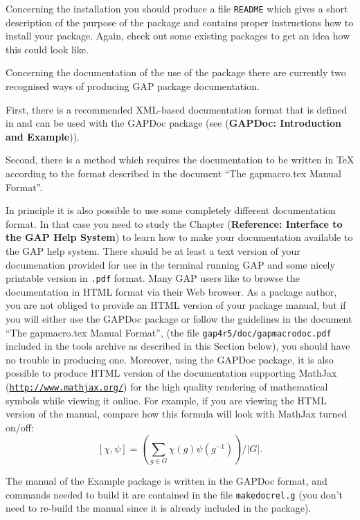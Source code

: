 \documentclass[a4paper,11pt]{report}
\begin{document}
{{ Concerning the installation you should produce a file \texttt{README} which gives a short description of the purpose of the package and contains
proper instructions how to install your package. Again, check out some
existing packages to get an idea how this could look like. 

 Concerning the documentation of the use of the package there are currently two
recognised ways of producing \textsf{GAP} package documentation. 

 First, there is a recommended XML-based documentation format that is defined
in and can be used with the \textsf{GAPDoc} package (see{\nobreakspace} (\textbf{GAPDoc: Introduction and Example})). 

 Second, there is a method which requires the documentation to be written in {\TeX} according to the format described in the document ``The gapmacro.tex Manual Format''. 

 In principle it is also possible to use some completely different
documentation format. In that case you need to study the
Chapter{\nobreakspace} (\textbf{Reference: Interface to the GAP Help System}) to learn how to make your documentation available to the \textsf{GAP} help system. There should be at least a text version of your documenation
provided for use in the terminal running \textsf{GAP} and some nicely printable version in \texttt{.pdf} format. Many \textsf{GAP} users like to browse the documentation in HTML format via their Web browser.
As a package author, you are not obliged to provide an HTML version of your
package manual, but if you will either use the \textsf{GAPDoc} package or follow the guidelines in the document ``The gapmacro.tex Manual Format'', (the file \texttt{gap4r5/doc/gapmacrodoc.pdf} included in the tools archive as described in this Section below), you should
have no trouble in producing one. Moreover, using the \textsf{GAPDoc} package, it is also possible to produce HTML version of the documentation
supporting MathJax (\href{http://www.mathjax.org/} {\texttt{http://www.mathjax.org/}}) for the high quality rendering of mathematical symbols while viewing it
online. For example, if you are viewing the HTML version of the manual,
compare how this formula will look with MathJax turned on/off: 
\[ [ \chi, \psi ] = \left( \sum_{{g \in G}} \chi(g) \psi(g^{{-1}}) \right) / |G|. \]
 

 The manual of the \textsf{Example} package is written in the \textsf{GAPDoc} format, and commands needed to build it are contained in the file \texttt{makedocrel.g} (you don't need to re-build the manual since it is already included in the
package). 

}}
\end{document}
